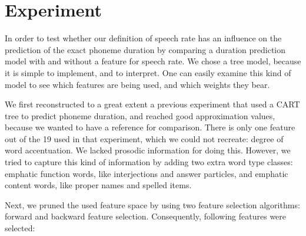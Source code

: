 \documentclass[a4paper]{scrreprt}
\begin{document}
\section{Experiment}
In order to test whether our definition of speech rate has an influence on the prediction of the exact phoneme duration by comparing a duration prediction model with and without a feature for speech rate. We chose a tree model, because it is simple to implement, and to interpret. One can easily examine this kind of model to see which features are being used, and which weights they bear. 

We first reconstructed to a great extent a previous experiment \cite{Brinckmann2003} that used a CART tree to predict phoneme duration, and reached good approximation values, because we wanted to have a reference for comparison. There is only one feature out of the 19 used in that experiment, which we could not recreate: degree of word accentuation. We lacked prosodic information for doing this. However, we tried to capture this kind of information by adding two extra word type classes: emphatic function words, like interjections and answer particles, and emphatic content words, like proper names and spelled items.

Next, we pruned the used feature space by using two feature selection algorithms: forward and backward feature selection. Consequently, following features were selected:
\end{document}
